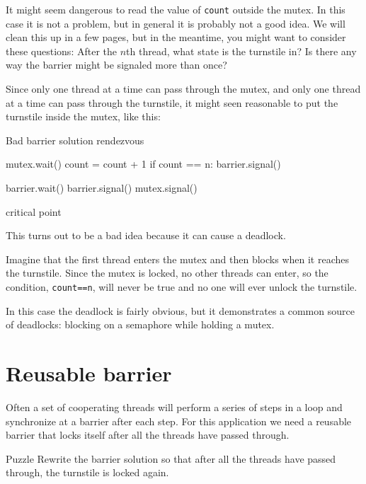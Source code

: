It might seem dangerous to read the value of {\tt count} outside the
mutex.  In this case it is not a problem, but in general it is
probably not a good idea.  We will clean this up in a few pages, but
in the meantime, you might want to consider these questions: After the
$n$th thread, what state is the turnstile in?  Is there any way the
barrier might be signaled more than once?



Since only one thread at a time can pass through the
mutex, and only one thread at a time can pass through
the turnstile, it might seen reasonable to put the
turnstile inside the mutex, like this:

\begin{lstbox}{Bad barrier solution}
rendezvous

mutex.wait()
    count = count + 1
    if count == n: barrier.signal()

    barrier.wait()
    barrier.signal()
mutex.signal()

critical point
\end{lstbox}

This turns out to be a bad idea because it can cause a
deadlock.

Imagine that the first thread enters the
mutex and then blocks when it reaches the turnstile.
Since the mutex is locked, no other threads can enter,
so the condition, {\tt count==n}, will never be true and
no one will ever unlock the turnstile.

In this case the deadlock is fairly obvious, but it
demonstrates a
common source of deadlocks: blocking on a semaphore while
holding a mutex.


\section {Reusable barrier}
\label{rebar}

Often a set of cooperating threads will perform a series of steps
in a loop and synchronize at a barrier after each step.  For this
application we need a reusable barrier that locks itself after
all the threads have passed through.

\begin{puzzlebox}{Puzzle}
Rewrite the barrier solution so that after all the threads
have passed through, the turnstile is locked again.
\end{puzzlebox}


